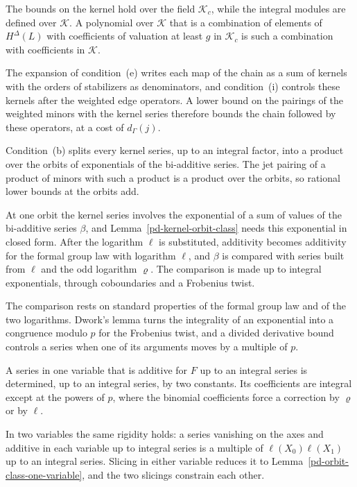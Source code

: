 The bounds on the kernel hold over the field $\mathcal K_c$, while the integral modules are defined over
$\mathcal K$. A polynomial over $\mathcal K$ that is a combination of elements of $H^\Delta(L)$ with
coefficients of valuation at least $g$ in $\mathcal K_c$ is such a combination with coefficients in
$\mathcal K$.

The expansion of condition~(e) writes each map of the chain as a sum of kernels with the orders of
stabilizers as denominators, and condition~(i) controls these kernels after the weighted edge operators.
A lower bound on the pairings of the weighted minors with the kernel series therefore bounds the chain
followed by these operators, at a cost of $d_\Gamma(j)$.

Condition~(b) splits every kernel series, up to an integral factor, into a product over the orbits of
exponentials of the bi-additive series. The jet pairing of a product of minors with such a product is a
product over the orbits, so rational lower bounds at the orbits add.

At one orbit the kernel series involves the exponential of a sum of values of the bi-additive series
$\beta$, and Lemma~\ref{pd-kernel-orbit-class} needs this exponential in closed form. After the
logarithm $\ell$ is substituted, additivity becomes additivity for the formal group law with logarithm
$\ell$, and $\beta$ is compared with series built from $\ell$ and the odd logarithm $\varrho$. The
comparison is made up to integral exponentials, through coboundaries and a Frobenius twist.

The comparison rests on standard properties of the formal group law and of the two logarithms. Dwork's
lemma turns the integrality of an exponential into a congruence modulo $p$ for the Frobenius twist, and a
divided derivative bound controls a series when one of its arguments moves by a multiple of $p$.

A series in one variable that is additive for $F$ up to an integral series is determined, up to an
integral series, by two constants. Its coefficients are integral except at the powers of $p$, where the
binomial coefficients force a correction by $\varrho$ or by $\ell$.

In two variables the same rigidity holds: a series vanishing on the axes and additive in each variable up
to integral series is a multiple of $\ell(X_0)\ell(X_1)$ up to an integral series. Slicing in either
variable reduces it to Lemma~\ref{pd-orbit-class-one-variable}, and the two slicings constrain each other.

